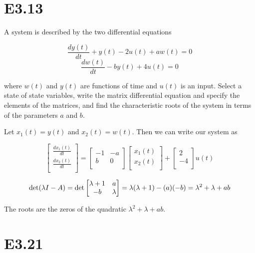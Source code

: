 \documentclass[11pt]{article}
\begin{document}
\section{E3.13}

A system is described by the two differential equations

\[ \dfrac{dy(t)}{dt} + y(t) - 2 u(t) + a w(t) = 0 \]
\[ \dfrac{dw(t)}{dt} - b y(t) + 4 u(t) = 0 \]

where $w(t)$ and $y(t)$ are functions of time and $u(t)$ is an input. Select a state of state variables, write the matrix differential equation and specify the elements of the matrices, and find the characteristic roots of the system in terms of the parameters $a$ and $b$.

Let $x_1(t) = y(t)$ and $x_2(t) = w(t)$. Then we can write our system as

\[
    \begin{bmatrix}
        \frac{d x_1(t)}{dt} \\
        \frac{d x_2(t)}{dt} \\
    \end{bmatrix}
    =
    \begin{bmatrix}
        -1 & -a \\
        b & 0 \\
    \end{bmatrix}
    \begin{bmatrix}
        x_1(t) \\
        x_2(t) \\
    \end{bmatrix}
    +
    \begin{bmatrix}
        2 \\
        -4 \\
    \end{bmatrix}
    u(t)
\]

\[
    \det(\lambda I - A) = \det
    \begin{bmatrix}
        \lambda + 1 & a \\
        -b & \lambda \\
    \end{bmatrix}
    = \lambda (\lambda + 1) - (a)(-b)
    = \lambda^2 + \lambda + ab \\
\]

The roots are the zeros of the quadratic $\lambda^2 + \lambda + ab$.

\section{E3.21}
\end{document}
